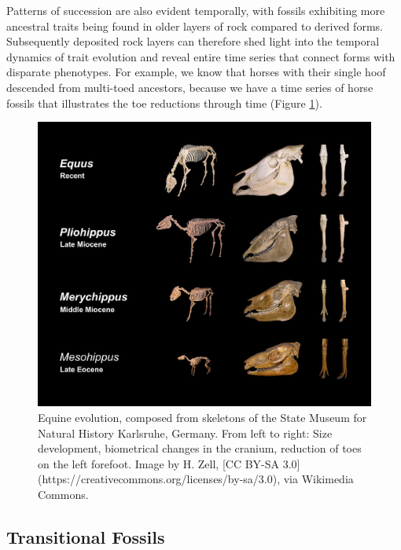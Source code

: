 \documentclass[
]{book}
\begin{document}
Patterns of succession are also evident temporally, with fossils exhibiting more ancestral traits being found in older layers of rock compared to derived forms. Subsequently deposited rock layers can therefore shed light into the temporal dynamics of trait evolution and reveal entire time series that connect forms with disparate phenotypes. For example, we know that horses with their single hoof descended from multi-toed ancestors, because we have a time series of horse fossils that illustrates the toe reductions through time (Figure \ref{fig:horse}).

\begin{figure}
\includegraphics[width=1\linewidth]{images/Equine_evolution} \caption{Equine evolution, composed from skeletons of the State Museum for Natural History Karlsruhe, Germany. From left to right: Size development, biometrical changes in the cranium, reduction of toes on the left forefoot. Image by H. Zell, [CC BY-SA 3.0](https://creativecommons.org/licenses/by-sa/3.0), via Wikimedia Commons.}\label{fig:horse}
\end{figure}

\hypertarget{transitional-fossils}{%
\subsection{Transitional Fossils}\label{transitional-fossils}}
\end{document}
